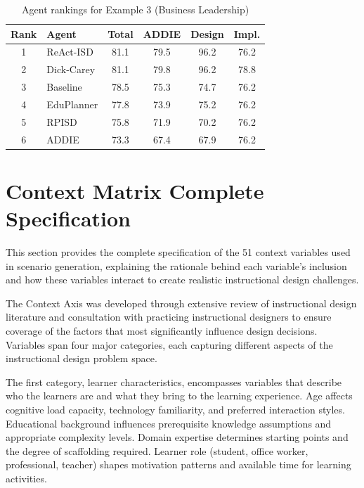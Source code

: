 \begin{table}[ht!]
\centering
\small
\caption{Agent rankings for Example 3 (Business Leadership)}
\label{tab:example3}
\begin{tabular}{clcccc}
\toprule
\textbf{Rank} & \textbf{Agent} & \textbf{Total} & \textbf{ADDIE} & \textbf{Design} & \textbf{Impl.} \\
\midrule
1 & ReAct-ISD & 81.1 & 79.5 & 96.2 & 76.2 \\
2 & Dick-Carey & 81.1 & 79.8 & 96.2 & 78.8 \\
3 & Baseline & 78.5 & 75.3 & 74.7 & 76.2 \\
4 & EduPlanner & 77.8 & 73.9 & 75.2 & 76.2 \\
5 & RPISD & 75.8 & 71.9 & 70.2 & 76.2 \\
6 & ADDIE & 73.3 & 67.4 & 67.9 & 76.2 \\
\bottomrule
\end{tabular}
\end{table}

\section{Context Matrix Complete Specification}
\label{app:context-matrix}

This section provides the complete specification of the 51 context variables used in scenario generation, explaining the rationale behind each variable's inclusion and how these variables interact to create realistic instructional design challenges.

The Context Axis was developed through extensive review of instructional design literature and consultation with practicing instructional designers to ensure coverage of the factors that most significantly influence design decisions. Variables span four major categories, each capturing different aspects of the instructional design problem space.

The first category, learner characteristics, encompasses variables that describe who the learners are and what they bring to the learning experience. Age affects cognitive load capacity, technology familiarity, and preferred interaction styles. Educational background influences prerequisite knowledge assumptions and appropriate complexity levels. Domain expertise determines starting points and the degree of scaffolding required. Learner role (student, office worker, professional, teacher) shapes motivation patterns and available time for learning activities.

